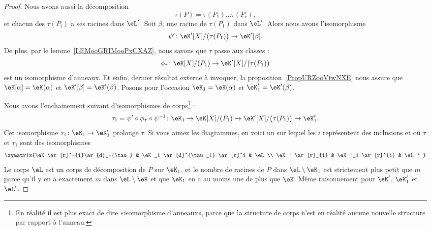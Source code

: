 \begin{proof}
	Nous avons aussi la décomposition
	\begin{equation}
		\tau(P)=\tau(P_1)\ldots \tau(P_r),
	\end{equation}
	et chacun des \( \tau(P_i)\) a ses racines dans \( \eL'\). Soit \( \beta\), une racine de \( \tau(P_1)\) dans \( \eL'\). Alors nous avons l'isomorphisme
	\begin{equation}
		\psi'\colon \eK'[X]/\big( \tau(P_1) \big)\to \eK'[\beta].
	\end{equation}
	De plus, par le lemme~\ref{LEMooGRIMooPxCXAZ}, nous savons que \( \tau\) passe aux classes :
	\begin{equation}
		\phi_{\tau}\colon \eK[X]/(P_1)\to \eK'[X]/\big( \tau(P_1) \big)
	\end{equation}
	est un isomorphisme d'anneaux. Et enfin, dernier résultat externe à invoquer, la proposition~\ref{PropURZooVtwNXE} nous assure que \( \eK[\alpha]=\eK(\alpha)\) et \( \eK'[\beta]=\eK'(\beta)\). Posons pour l'occasion \( \eK_1=\eK(\alpha)\) et \( \eK'_1=\eK'(\beta)\).

	Nous avons l'enchainement suivant d'isomorphismes de corps\footnote{En réalité il est plus exact de dire «isomorphisme d'anneaux», parce que la structure de corps n'est en réalité aucune nouvelle structure par rapport à l'anneau.} :
	\begin{equation}
		\tau_1=\psi'\circ\phi_{\tau}\circ\psi^{-1} \colon \eK_1\to \eK[X]/(P_1)\to\eK'[X]/\big( \tau(P_1) \big)\to \eK'_1.
	\end{equation}
	Cet isomorphisme \( \tau_1\colon \eK_1\to \eK_1'\) prolonge \( \tau\). Si vous aimez les diagrammes, en voici un sur lequel les \( i\) représentent des inclusions et où \( \tau\) et \( \tau_1\) sont des isomorphismes
	\begin{equation}
		\xymatrix{%
		\eK \ar[r]^-{i}\ar[d]_-{\tau}       &   \eK_1   \ar[d]^{\tau_1} \ar[r]^i    &   \eL\\
		\eK' \ar[r]_{i}                     &   \eK'_1  \ar[r]^{i}                  &   \eL'
		}
	\end{equation}
	Le corps \( \eL\) est un corps de décomposition de \( P\) sur \( \eK_1\), et le nombre de racines de \( P\) dans \( \eL\setminus\eK_1\) est strictement plus petit que \( m\) parce qu'il y en a exactement \( m\) dans \( \eL\setminus \eK\) et que \( \eK_1\) en a au moins une de plus que \( \eK\). Même raisonnement pour \( \eK'\), \( \eK'_1\) et \( \eL'\).


\end{proof}
